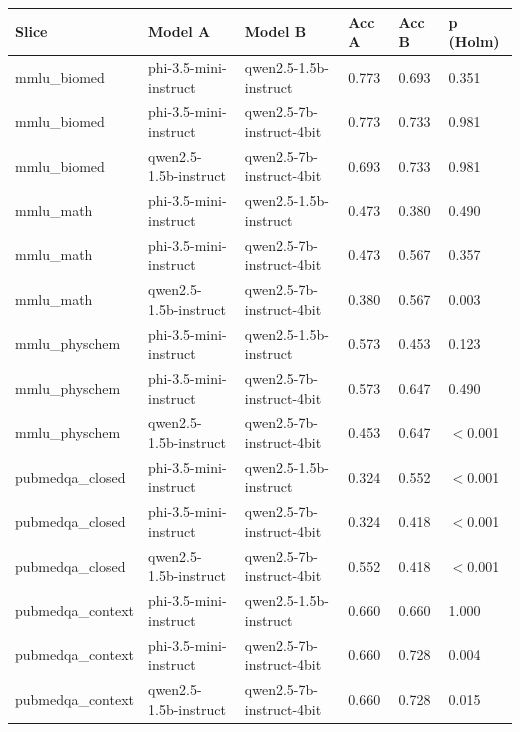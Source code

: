 \begin{tabular}{llllll}
\toprule
Slice & Model A & Model B & Acc A & Acc B & p (Holm) \\
\midrule
mmlu\_biomed & phi-3.5-mini-instruct & qwen2.5-1.5b-instruct & 0.773 & 0.693 & 0.351 \\
mmlu\_biomed & phi-3.5-mini-instruct & qwen2.5-7b-instruct-4bit & 0.773 & 0.733 & 0.981 \\
mmlu\_biomed & qwen2.5-1.5b-instruct & qwen2.5-7b-instruct-4bit & 0.693 & 0.733 & 0.981 \\
mmlu\_math & phi-3.5-mini-instruct & qwen2.5-1.5b-instruct & 0.473 & 0.380 & 0.490 \\
mmlu\_math & phi-3.5-mini-instruct & qwen2.5-7b-instruct-4bit & 0.473 & 0.567 & 0.357 \\
mmlu\_math & qwen2.5-1.5b-instruct & qwen2.5-7b-instruct-4bit & 0.380 & 0.567 & 0.003 \\
mmlu\_physchem & phi-3.5-mini-instruct & qwen2.5-1.5b-instruct & 0.573 & 0.453 & 0.123 \\
mmlu\_physchem & phi-3.5-mini-instruct & qwen2.5-7b-instruct-4bit & 0.573 & 0.647 & 0.490 \\
mmlu\_physchem & qwen2.5-1.5b-instruct & qwen2.5-7b-instruct-4bit & 0.453 & 0.647 & $<$0.001 \\
pubmedqa\_closed & phi-3.5-mini-instruct & qwen2.5-1.5b-instruct & 0.324 & 0.552 & $<$0.001 \\
pubmedqa\_closed & phi-3.5-mini-instruct & qwen2.5-7b-instruct-4bit & 0.324 & 0.418 & $<$0.001 \\
pubmedqa\_closed & qwen2.5-1.5b-instruct & qwen2.5-7b-instruct-4bit & 0.552 & 0.418 & $<$0.001 \\
pubmedqa\_context & phi-3.5-mini-instruct & qwen2.5-1.5b-instruct & 0.660 & 0.660 & 1.000 \\
pubmedqa\_context & phi-3.5-mini-instruct & qwen2.5-7b-instruct-4bit & 0.660 & 0.728 & 0.004 \\
pubmedqa\_context & qwen2.5-1.5b-instruct & qwen2.5-7b-instruct-4bit & 0.660 & 0.728 & 0.015 \\
\bottomrule
\end{tabular}
